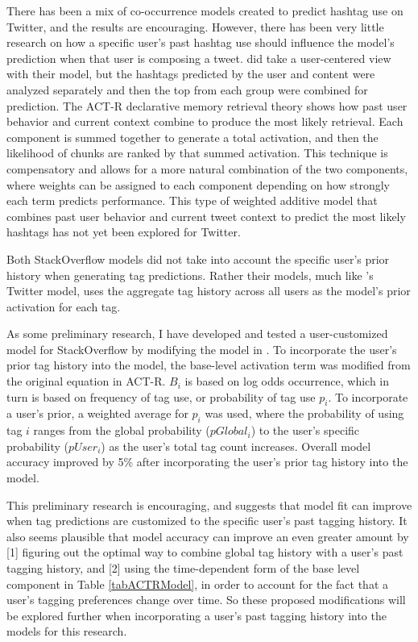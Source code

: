 \documentclass[man,floatsintext,donotrepeattitle]{apa6}
\begin{document}
There has been a mix of co-occurrence models created to predict hashtag use on Twitter, and the results are encouraging.
However, there has been very little research on how a specific user's past hashtag use should influence the model's prediction when that user is composing a tweet.
\textcite{Kywe2012} did take a user-centered view with their model, but the hashtags predicted by the user and content were analyzed separately and then the top from each group were combined for prediction.
The ACT-R declarative memory retrieval theory shows how past user behavior and current context combine to produce the most likely retrieval.
Each component is summed together to generate a total activation, and then the likelihood of chunks are ranked by that summed activation.
This technique is compensatory and allows for a more natural combination of the two components, where weights can be assigned to each component depending on how strongly each term predicts performance.
This type of weighted additive model that combines past user behavior and current tweet context to predict the most likely hashtags has not yet been explored for Twitter.

Both StackOverflow models \parencites{Stanley2013,Kuo2011} did not take into account the specific user's prior history when generating tag predictions.
Rather their models, much like \textcite{Mazzia2009}'s Twitter model, uses the aggregate tag history across all users as the model's prior activation for each tag.

As some preliminary research, I have developed and tested a user-customized model for StackOverflow by modifying the model in \textcite{Stanley2013}.
To incorporate the user's prior tag history into the model, the base-level activation term was modified from the original equation in ACT-R.
$B_{i}$ is based on log odds occurrence, which in turn is based on frequency of tag use, or probability of tag use $p_{i}$.
To incorporate a user's prior, a weighted average for $p_{i}$ was used,
where the probability of using tag $i$ ranges from the global probability ($pGlobal_{i}$) to the user's specific probability ($pUser_{i}$) as the user's total tag count increases.
Overall model accuracy improved by 5\% after incorporating the user's prior tag history into the model.

This preliminary research is encouraging, and suggests that model fit can improve when tag predictions are customized to the specific user's past tagging history.
It also seems plausible that model accuracy can improve an even greater amount by
[1] figuring out the optimal way to combine global tag history with a user's past tagging history, and
[2] using the time-dependent form of the base level component in Table \ref{tabACTRModel}, in order to account for the fact that a user's tagging preferences change over time.
So these proposed modifications will be explored further when incorporating a user's past tagging history into the models for this research.
\end{document}
